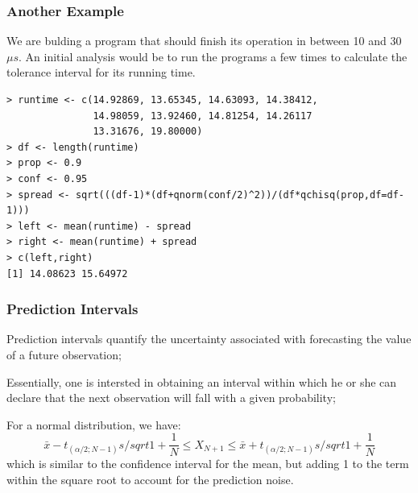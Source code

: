 \documentclass[10pt]{beamer}
\begin{document}
\begin{frame}
  \frametitle{Another Example} 
  We are bulding a program that should finish its operation in between
  10 and 30$\mu s$. An initial analysis would be to run the programs a
  few times to calculate the tolerance interval for its running time.

{\smaller
\begin{verbatim}
> runtime <- c(14.92869, 13.65345, 14.63093, 14.38412, 
               14.98059, 13.92460, 14.81254, 14.26117
               13.31676, 19.80000)
> df <- length(runtime)
> prop <- 0.9
> conf <- 0.95
> spread <- sqrt(((df-1)*(df+qnorm(conf/2)^2))/(df*qchisq(prop,df=df-1)))
> left <- mean(runtime) - spread
> right <- mean(runtime) + spread
> c(left,right)
[1] 14.08623 15.64972
\end{verbatim}}
\end{frame}

\begin{frame}
  \frametitle{Prediction Intervals} 
  Prediction intervals quantify the uncertainty associated with
  forecasting the value of a future observation;
  
  \medskip

  Essentially, one is intersted in obtaining an interval within which
  he or she can declare that the next observation will fall with a
  given probability;

  \medskip

  For a normal distribution, we have:
  \begin{equation*}
    \bar{x} - t_{(\alpha/2;N-1)}s/sqrt{1+\frac{1}{N}} \leq X_{N+1} \leq \bar{x} + t_{(\alpha/2;N-1)}s/sqrt{1+\frac{1}{N}}
  \end{equation*}
  which is similar to the confidence interval for the mean, but adding
  1 to the term within the square root to account for the prediction
  noise.
\end{frame}
\end{document}
